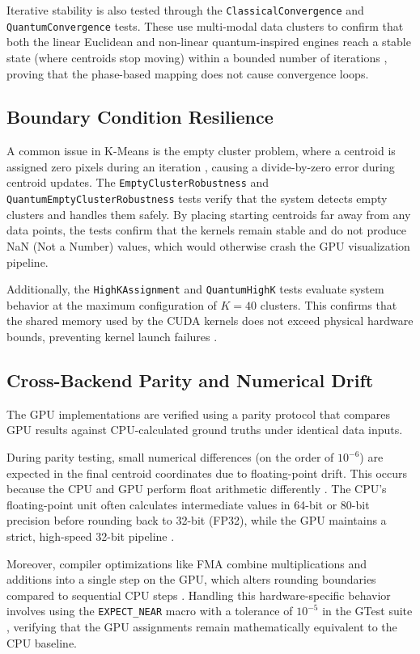 Iterative stability is also tested through the \texttt{ClassicalConvergence} and \texttt{QuantumConvergence} tests. These use multi-modal data clusters to confirm that both the linear Euclidean and non-linear quantum-inspired engines reach a stable state (where centroids stop moving) within a bounded number of iterations \cite{lloyd1982least}, proving that the phase-based mapping does not cause convergence loops.

\subsection{Boundary Condition Resilience}
A common issue in K-Means is the empty cluster problem, where a centroid is assigned zero pixels during an iteration \cite{aloise2017strategies}, causing a divide-by-zero error during centroid updates. The \texttt{EmptyClusterRobustness} and \texttt{QuantumEmptyClusterRobustness} tests verify that the system detects empty clusters and handles them safely. By placing starting centroids far away from any data points, the tests confirm that the kernels remain stable and do not produce NaN (Not a Number) values, which would otherwise crash the GPU visualization pipeline.

Additionally, the \texttt{HighKAssignment} and \texttt{QuantumHighK} tests evaluate system behavior at the maximum configuration of $K=40$ clusters. This confirms that the shared memory used by the CUDA kernels does not exceed physical hardware bounds, preventing kernel launch failures \cite{CudaGuide}.

\subsection{Cross-Backend Parity and Numerical Drift}
The GPU implementations are verified using a parity protocol that compares GPU results against CPU-calculated ground truths under identical data inputs.

During parity testing, small numerical differences (on the order of $10^{-6}$) are expected in the final centroid coordinates due to floating-point drift. This occurs because the CPU and GPU perform float arithmetic differently \cite{CudaGuide, cook2012cuda}. The CPU's floating-point unit often calculates intermediate values in 64-bit or 80-bit precision before rounding back to 32-bit (FP32), while the GPU maintains a strict, high-speed 32-bit pipeline \cite{CudaGuide}. 

Moreover, compiler optimizations like FMA combine multiplications and additions into a single step on the GPU, which alters rounding boundaries compared to sequential CPU steps \cite{CudaGuide}. Handling this hardware-specific behavior involves using the \texttt{EXPECT\_NEAR} macro with a tolerance of $10^{-5}$ in the GTest suite \cite{googletest}, verifying that the GPU assignments remain mathematically equivalent to the CPU baseline.

